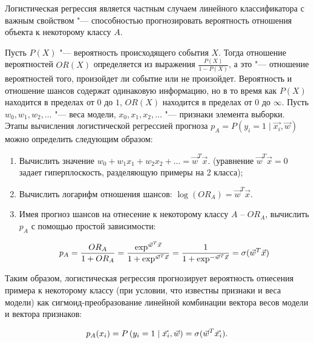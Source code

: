 \documentclass[bachelor, och, coursework]{SCWorks}
\begin{document}
            Логистическая регрессия является частным случаем линейного
            классификатора с важным свойством "--- способностью прогнозировать
            вероятность отношения объекта к некоторому классу $A$.

            Пусть $P(X)$ "--- вероятность происходящего события $X$. Тогда
            отношение вероятностей $OR(X)$ определяется из выражения
            $\frac{P(X)}{1 - P(X)}$, а это "--- отношение вероятностей того,
            произойдет ли событие или не произойдет. Вероятность и отношение
            шансов содержат одинаковую информацию, но в то время как $P(X)$
            находится в пределах от $0$ до $1$, $OR(X)$ находится в пределах от
            $0$ до $\infty$. Пусть $w_0, w_1, w_2, \dots$ "--- веса модели,
            $x_0, x_1, x_2, \dots$ "--- признаки элемента выборки. Этапы
            вычисления логистической регрессией прогноза $p_A = P\left(y_i = 1
            \mid \vec{x_i}, \vec{w}\right)$ можно определить следующим образом:

            \begin{enumerate}
                \item Вычислить значение $w_{0}+w_{1}x_1 + w_{2}x_2 + ... =
                \vec{w}^T\vec{x}$. (уравнение $\vec{w}^T\vec{x} = 0$ задает
                гиперплоскость, разделяющую примеры на 2 класса);
                \item Вычислить логарифм отношения шансов: $ \log(OR_{A}) =
                \vec{w}^T\vec{x}$.
                \item Имея прогноз шансов на отнесение к некоторому классу $A$ –
                $OR_{A}$, вычислить $p_{A}$ с помощью простой зависимости:

                $$\large p_{A} = \frac{OR_{A}}{1 + OR_{A}} =
                \frac{\exp^{\vec{w}^T\vec{x}}}{1 + \exp^{\vec{w}^T\vec{x}}} =
                \frac{1}{1 + \exp^{-\vec{w}^T\vec{x}}} =
                \sigma(\vec{w}^T\vec{x})$$
            \end{enumerate}

            Таким образом, логистическая регрессия прогнозирует вероятность
            отнесения примера к некоторому классу (при условии, что известны
            признаки и веса модели) как сигмоид-преобразование линейной
            комбинации вектора весов модели и вектора признаков:

            $$\large p_A(x_i) = P\left(y_i = 1 \mid \vec{x_i}, \vec{w}\right) =
            \sigma(\vec{w}^T\vec{x_i}). $$
\end{document}
